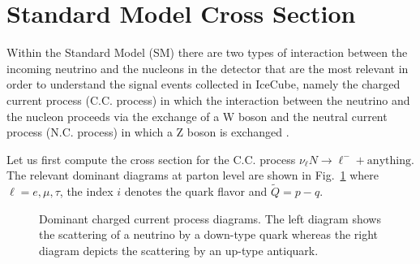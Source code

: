 \documentclass[aps,preprint,tightenlines,floatfix,superscriptaddress,nofootinbib,showpacs]{revtex4-1}
\begin{document}
\section{Standard Model Cross Section}
Within the Standard Model (SM) there are two types of interaction between the incoming neutrino and the nucleons in the detector that are the most relevant in order to understand the signal events collected in IceCube, namely the charged current process (C.C. process) in which the interaction between the neutrino and the nucleon proceeds via the exchange of a W boson and the neutral current process (N.C. process) in which a Z boson is exchanged \cite{Gandhi}.\par Let us first compute the cross section for the C.C. process $\nu_{\ell} N \rightarrow \ell^- + \mbox{anything}$. The relevant dominant diagrams at parton level are shown in Fig.~\ref{fig1} where $\ell =e,\mu,\tau$, the index $i$ denotes the quark flavor and $\tilde{Q}=p-q$.
\begin{center}
\begin{figure}[H]
\centering
\hspace*{0.2\textwidth}
\caption{Dominant charged current process diagrams. The left diagram shows the scattering of a neutrino by a down-type quark whereas the right diagram depicts the scattering by an up-type antiquark.}
\label{fig1}
\end{figure}
\end{center}
\end{document}
